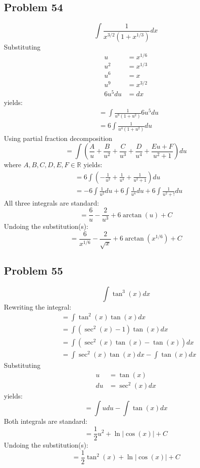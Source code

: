 \documentclass{article}
\begin{document}
\subsection*{Problem 54}
$$\int\frac{1}{x^{3/2}\left(1+x^{1/3}\right)}dx$$
Substituting
\begin{align*}
u&=x^{1/6} \\
u^2&=x^{1/3} \\
u^6&=x \\
u^9&=x^{3/2} \\
6u^5du&=dx
\end{align*}
yields:
\begin{align*}
&=\int\frac{1}{u^9(1+u^2)}6u^5du \\
&=6\int\frac{1}{u^4(1+u^2)}du
\end{align*}
Using partial fraction decomposition
$$=\int\left(\frac{A}{u}+\frac{B}{u^2}+\frac{C}{u^3}+\frac{D}{u^4}+\frac{Eu+F}{u^2+1}\right)du$$
where $A,B,C,D,E,F\in\mathbb{R}$ yields:
\begin{align*}
&=6\int\left(-\frac{1}{u^2}+\frac{1}{u^4}+\frac{1}{u^2+1}\right)du \\
&=-6\int\frac{1}{u^2}du+6\int\frac{1}{u^4}du+6\int\frac{1}{u^2+!}du
\end{align*}
All three integrals are standard:
$$=\frac{6}{u}-\frac{2}{u^3}+6\arctan(u)+C$$
Undoing the substitution(s):
$$=\frac{6}{x^{1/6}}-\frac{2}{\sqrt{x}}+6\arctan\left(x^{1/6}\right)+C$$
\subsection*{Problem 55}
$$\int\tan^3\left(x\right)dx$$
Rewriting the integral:
\begin{align*}
&=\int\tan^2(x)\tan(x)dx \\
&=\int(\sec^2(x)-1)\tan(x)dx \\
&=\int(\sec^2(x)\tan(x)-\tan(x))dx \\
&=\int\sec^2(x)\tan(x)dx-\int\tan(x)dx
\end{align*}
Substituting
\begin{align*}
u&=\tan(x) \\
du&=\sec^2(x)dx
\end{align*}
yields:
$$=\int udu-\int\tan(x)dx$$
Both integrals are standard:
$$=\frac{1}{2}u^2+\ln|\cos(x)|+C$$
Undoing the substitution(s):
$$=\frac{1}{2}\tan^2(x)+\ln|\cos(x)|+C$$
\end{document}
